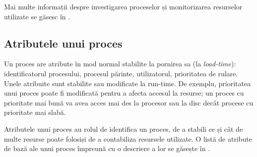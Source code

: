 Mai multe informații despre investigarea proceselor și monitorizarea resurselor
utilizate se găsesc în .

\subsection{Atributele unui proces}
\label{sec:procese-resurse-atribute}

Un proces are atribute în mod normal stabilite la pornirea sa (la \textit{load-time}):
identificatorul procesului, procesul părinte, utilizatorul, prioritatea de
rulare. Unele atribuite sunt stabilite sau modificate la run-time. De exemplu,
prioritatea unui proces poate fi modificată pentru a afecta accesul la resurse;
un proces cu prioritate mai bună va avea acces mai des la procesor sau la disc
decât procese cu prioritate mai slabă.

Atributele unui proces au rolul de identifica un proces, de a stabili ce și cât
de multe resurse poate folosiși de a contabiliza resursele utilizate. O listă de
atribute de bază ale unui proces împreună cu o descriere a lor se găsește în
.

